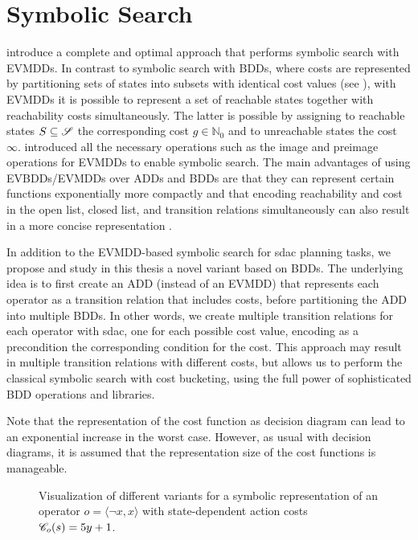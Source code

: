 \section{Symbolic Search}
\textcite{speck-et-al-icaps2018} introduce a complete and optimal approach that performs symbolic search with EVMDDs.
In contrast to symbolic search with BDDs, where costs are represented by partitioning sets of states into subsets with identical cost values (see ), with EVMDDs it is possible to represent a set of reachable states together with reachability costs simultaneously.
The latter is possible by assigning to reachable states $S \subseteq \mathscr S$ the corresponding cost $g \in \mathbb{N}_0$ and to unreachable states the cost $\infty$.
\textcite{speck-et-al-icaps2018} introduced all the necessary operations such as the image and preimage operations for EVMDDs to enable symbolic search.
The main advantages of using EVBDDs/EVMDDs over ADDs and BDDs are that they can represent certain functions exponentially more compactly and that encoding reachability and cost in the open list, closed list, and transition relations simultaneously can also result in a more concise representation \autocite{speck-et-al-icaps2018}.

In addition to the EVMDD-based symbolic search for sdac planning tasks, we propose and study in this thesis a novel variant based on BDDs.
The underlying idea is to first create an ADD (instead of an EVMDD) that represents each operator as a transition relation that includes costs, before partitioning the ADD into multiple BDDs.
In other words, we create multiple transition relations for each operator with sdac, one for each possible cost value, encoding as a precondition the corresponding condition for the cost. This approach may result in multiple transition relations with different costs, but allows us to perform the classical symbolic search with cost bucketing, using the full power of sophisticated BDD operations and libraries.

Note that the representation of the cost function as decision diagram can lead to an exponential increase in the worst case. However, as usual with decision diagrams, it is assumed that the representation size of the cost functions is manageable.

\begin{figure}
    \hfill
    \caption[Visualization of symbolic representations of an operator with state-dependent action costs.]{Visualization of different variants for a symbolic representation of an operator $o = \langle \lnot x, x \rangle$ with state-dependent action costs $\mathscr C_o(s) = 5y +1$.}
    \label{fig:tr_sdac}
\end{figure}

